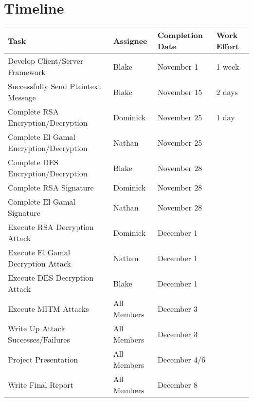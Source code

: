 \documentclass[12pt]{report}
\begin{document}
\section{Timeline}
\begin{tabular}{l|l|l|l}
    Task & Assignee & Completion Date & Work Effort\\ \hline
    Develop Client/Server Framework & Blake & November 1 & 1 week\\
    Successfully Send Plaintext Message & Blake & November 15 & 2 days\\
    Complete RSA Encryption/Decryption & Dominick & November 25 & 1 day\\
    Complete El Gamal Encryption/Decryption & Nathan & November 25 & \\
    Complete DES Encryption/Decryption & Blake & November 28\\
    Complete RSA Signature & Dominick & November 28\\
    Complete El Gamal Signature & Nathan & November 28\\
    Execute RSA Decryption Attack & Dominick & December 1\\
    Execute El Gamal Decryption Attack & Nathan & December 1\\
    Execute DES Decryption Attack & Blake & December 1\\
    Execute MITM Attacks & All Members & December 3\\
    Write Up Attack Successes/Failures & All Members & December 3\\
    Project Presentation & All Members & December 4/6\\ 
    Write Final Report & All Members & December 8
\end{tabular}

\end{document}
